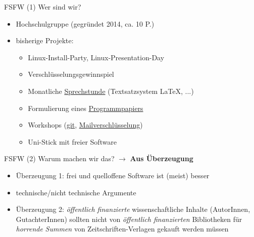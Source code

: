 \documentclass[t]{beamer}
\begin{document}
\begin{frame}[label=ct1]{\color{fg}FSFW (1)}
Wer sind wir?
  \begin{itemize}
  \item Hochschulgruppe (gegründet 2014, ca. 10 P.)
  \item bisherige Projekte:
  \begin{itemize}
   \item Linux-Install-Party, Linux-Presentation-Day
   \item Verschlüsselungsgewinnspiel
   \item Monatliche \href{https://fsfw-dresden.de/sprechstunde}{Sprechstunde} (Textsatzsystem \LaTeX, ...)
   \item Formulierung eines \href{https://fsfw-dresden.de/programm}{Programmpapiers}
   \item Workshops (\href{https://fsfw-dresden.de/git-ws}{git}, \href{https://fsfw-dresden.de/gpg}{Mailverschlüsselung})
   \item Uni-Stick mit freier Software
  \end{itemize}
  \end{itemize}  
\end{frame}


\begin{frame}[label=ct2]{\color{fg}FSFW (2)}
Warum machen wir das? $\rightarrow$ \textbf{Aus Überzeugung}\\[1cm]
  \begin{itemize}
  \item Überzeugung 1: frei und quelloffene Software ist (meist) besser
  \item[] technische/nicht technische Argumente
  \pause
  \bigskip
  \item Überzeugung 2: \textit{öffentlich finanzierte} wissenschaftliche Inhalte
  (AutorInnen, GutachterInnen) sollten nicht von \textit{öffentlich finanzierten}
  Bibliotheken für \textit{horrende Summen} von Zeitschriften-Verlagen gekauft werden müssen
  \end{itemize}  
\end{frame}
\end{document}
